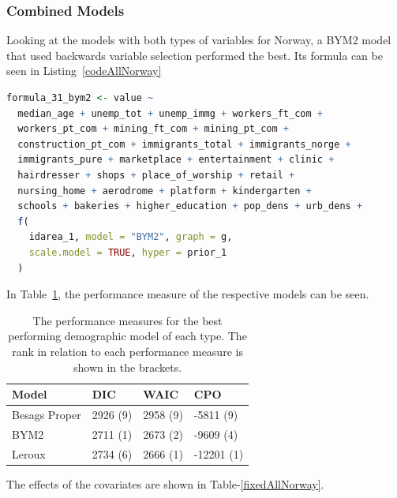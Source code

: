 \subsubsection{Combined Models}
Looking at the models with both types of variables for Norway, a BYM2 model that used backwards variable selection performed the best. Its formula can be seen in Listing~\ref{codeAllNorway}
\begin{lstlisting}[caption={The formula for the best BYM2 model based all variables}, label={codeAllNorway}, language = R]
formula_31_bym2 <- value ~
  median_age + unemp_tot + unemp_immg + workers_ft_com + 
  workers_pt_com + mining_ft_com + mining_pt_com +
  construction_pt_com + immigrants_total + immigrants_norge +
  immigrants_pure + marketplace + entertainment + clinic + 
  hairdresser + shops + place_of_worship + retail + 
  nursing_home + aerodrome + platform + kindergarten + 
  schools + bakeries + higher_education + pop_dens + urb_dens +
  f(
    idarea_1, model = "BYM2", graph = g,
    scale.model = TRUE, hyper = prior_1
  )
\end{lstlisting}
In Table~\ref{allNorway}, the performance measure of the respective models can be seen.
\begin{table}[H] 
\caption{The performance measures for the best performing demographic model of each type. The rank in relation to each performance measure is shown in the brackets. \label{allNorway}}
\begin{tabular}{l l l l}
\toprule
\textbf{Model}	& \textbf{DIC}	& \textbf{WAIC} & \textbf{CPO} \\
\midrule
Besags Proper  & 2926 (9) & 2958 (9) & -5811 (9) \\
BYM2 & 2711 (1) & 2673 (2) & -9609 (4)\\
Leroux & 2734 (6) & 2666 (1) & -12201 (1) \\
\bottomrule
\end{tabular}
\end{table}
The effects of the covariates are shown in Table-\ref{fixedAllNorway}.

